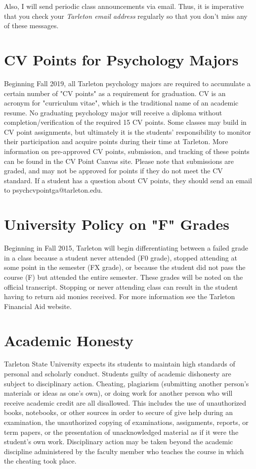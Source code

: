 \documentclass[10pt]{article}
\begin{document}
Also, I will send periodic class announcements via email.  Thus, it is imperative that you check your \emph{Tarleton email address} regularly so that you don't miss any of these messages.

\section*{CV Points for Psychology Majors}
\label{sec:orge957355}
Beginning Fall 2019, all Tarleton psychology majors are required to accumulate a certain number of "CV points" as a requirement for graduation. CV is an acronym for "curriculum vitae", which is the traditional name of an academic resume.  No graduating psychology major will receive a diploma without completion/verification of the required 15 CV points. Some classes may build in CV point assignments, but ultimately it is the students’ responsibility to monitor their participation and acquire points during their time at Tarleton.  More information on pre-approved CV points, submission, and tracking of these points can be found in the CV Point Canvas site. Please note that submissions are graded, and may not be approved for points if they do not meet the CV standard.  If a student has a question about CV points, they should send an email to psychcvpointga@tarleton.edu.

\section*{University Policy on "F" Grades}
\label{sec:orga4ba0fd}
Beginning in Fall 2015, Tarleton will begin differentiating between a failed grade in a class because a student never attended (F0 grade), stopped attending at some point in the semester (FX grade), or because the student did not pass the course (F) but attended the entire semester. These grades will be noted on the official transcript. Stopping or never attending class can result in the student having to return aid monies received.  For more information see the Tarleton Financial Aid website.
\section*{Academic Honesty}
\label{sec:org93deca0}

Tarleton State University expects its students to maintain high standards of personal and scholarly conduct. Students guilty of academic dishonesty are subject to disciplinary action. Cheating, plagiarism (submitting another person’s materials or ideas as one’s own), or doing work for another person who will receive academic credit are all disallowed. This includes the use of unauthorized books, notebooks, or other sources in order to secure of give help during an examination, the unauthorized copying of examinations, assignments, reports, or term papers, or the presentation of unacknowledged material as if it were the student’s own work. Disciplinary action may be taken beyond the academic discipline administered by the faculty member who teaches the course in which the cheating took place.
\end{document}
